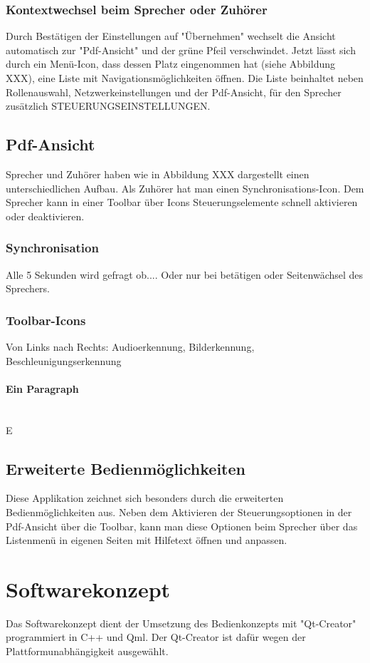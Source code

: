 \subsubsection{Kontextwechsel beim Sprecher oder Zuhörer}
Durch Bestätigen der Einstellungen auf "Übernehmen" wechselt die Ansicht automatisch zur "Pdf-Ansicht" und der grüne Pfeil verschwindet. Jetzt lässt sich durch ein Menü-Icon, dass dessen Platz eingenommen hat (siehe Abbildung XXX), eine Liste mit Navigationsmöglichkeiten öffnen. Die Liste beinhaltet neben Rollenauswahl, Netzwerkeinstellungen und der Pdf-Ansicht, für den Sprecher zusätzlich STEUERUNGSEINSTELLUNGEN.
\subsection{Pdf-Ansicht}
Sprecher und Zuhörer haben wie in Abbildung XXX dargestellt einen unterschiedlichen Aufbau. Als Zuhörer hat man einen Synchronisations-Icon. Dem Sprecher kann in einer Toolbar über Icons Steuerungselemente schnell aktivieren oder deaktivieren.
\subsubsection{Synchronisation}
Alle 5 Sekunden wird gefragt ob.... Oder nur bei betätigen oder Seitenwächsel des Sprechers.
\subsubsection{Toolbar-Icons}
Von Links nach Rechts: Audioerkennung, Bilderkennung, Beschleunigungserkennung
\paragraph{Ein Paragraph}$\;$\\
E
\subsection{Erweiterte Bedienmöglichkeiten}
Diese Applikation zeichnet sich besonders durch die erweiterten Bedienmöglichkeiten aus. Neben dem Aktivieren der Steuerungsoptionen in der Pdf-Ansicht über die Toolbar, kann man diese Optionen beim Sprecher über das Listenmenü in eigenen Seiten mit Hilfetext öffnen und anpassen.
\section{Softwarekonzept}
Das Softwarekonzept dient der Umsetzung des Bedienkonzepts mit "Qt-Creator" programmiert in C++ und Qml. Der Qt-Creator ist dafür wegen der Plattformunabhängigkeit ausgewählt.
